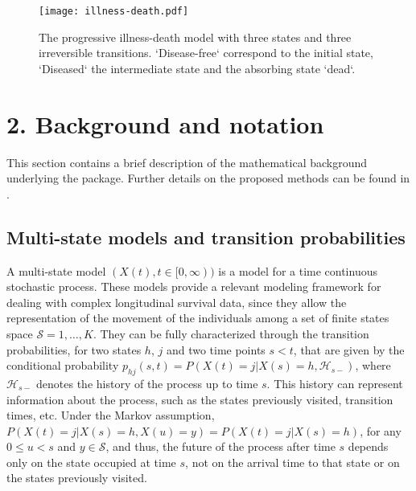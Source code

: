 \begin{figure} [t] %
\centering
\texttt{[image: illness-death.pdf]}
\caption{\label{IDM} The progressive illness-death model with three states and three irreversible transitions. `Disease-free` correspond to the initial state, `Diseased` the intermediate state and the absorbing state `dead`.}
\end{figure}


\section{2. Background and notation} \label{sec:methodology}

This section contains a brief description of the mathematical background underlying the  package. Further details on the proposed methods can be found in \cite{soutinho_machado2020}.

\subsection{Multi-state models and transition probabilities} \label{multi}
A multi-state model $(X(t),t\in [0,\infty))$ is a model for a time continuous stochastic process. These models provide a relevant modeling framework for dealing with complex longitudinal survival data, since they allow the representation of the movement of the individuals among a set of finite states space $\mathcal{S}={1,\ldots ,K}$. They can be fully characterized through the transition probabilities, for two states $h$, $j$ and two time points $s < t$, that are given by the conditional probability $p_{hj}(s,t)=P(X(t)=j|X(s)=h, \mathcal{H}_{s-})$, where $\mathcal{H}_{s-}$ denotes the history of the process up to time $s$. This history can represent information about the process, such as the states previously visited, transition times, etc. Under the Markov assumption, $P(X(t)=j|X(s)=h, X(u)=y)=P(X(t)=j|X(s)=h)$, for any $0\leq u<s$ and $y \in \mathcal{S}$, and thus, the future of the process after time $s$ depends only on the state occupied at time $s$, not on the arrival time to that state or on the states previously visited.  

